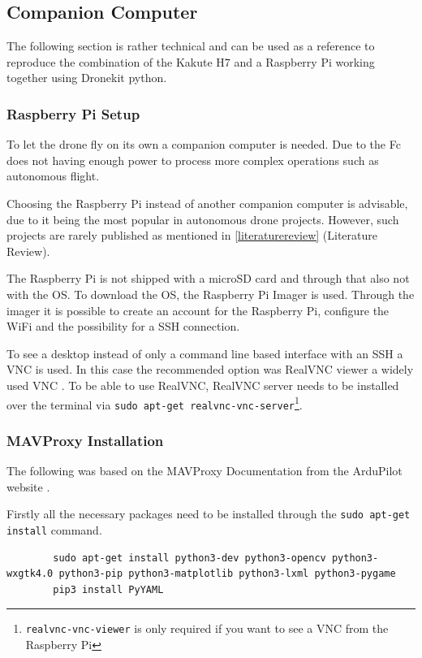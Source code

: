 \documentclass[svgnames]{article}
\begin{document}
	\subsection{Companion Computer}\label{companion computer}
	The following section is rather technical and can be used as a reference to reproduce the combination of the Kakute H7 and a Raspberry Pi working together using Dronekit python.
	\subsubsection{Raspberry Pi Setup}
	
	To let the drone fly on its own a companion computer is needed. Due to the \gls{Fc} does not having enough power to process more complex operations such as autonomous flight.
	
	Choosing the Raspberry Pi instead of another companion computer is advisable, due to it being the most popular in autonomous drone projects. However, such projects are rarely published as mentioned in \cref{literaturereview} (Literature Review).
	
	The Raspberry Pi is not shipped with a microSD card and through that also not with the \gls{OS}. To download the \gls{OS}, the Raspberry Pi Imager is used. Through the imager it is possible to create an account for the Raspberry Pi,  configure the WiFi and the possibility for a \gls{SSH} connection. 

	
	To see a desktop instead of only a command line based interface with an \gls{SSH} a \gls{VNC} is used. In this case the recommended option was RealVNC viewer a widely used \gls{VNC} \cite{ionisvnctutorial}. To be able to use RealVNC, RealVNC server needs to be installed over the terminal via \lstinline|sudo apt-get realvnc-vnc-server|\footnote{\lstinline|realvnc-vnc-viewer| is only required if you want to see a VNC from the Raspberry Pi}.
	
	\subsubsection{MAVProxy Installation}
	The following was based on the MAVProxy Documentation from the ArduPilot website  \cite{MavProxydocs}.
	
	Firstly all the necessary packages need to be installed through the \lstinline|sudo apt-get install| command. 
	\begin{lstlisting}
		sudo apt-get install python3-dev python3-opencv python3-wxgtk4.0 python3-pip python3-matplotlib python3-lxml python3-pygame
		pip3 install PyYAML
	\end{lstlisting}
\end{document}
